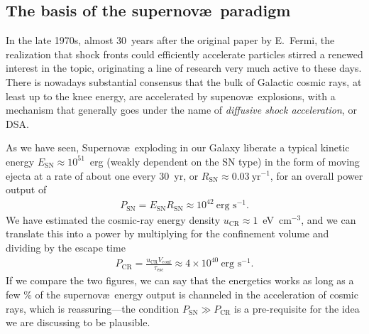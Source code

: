\subsection{The basis of the supernov\ae~paradigm}

In the late 1970s, almost 30~years after the original paper by E.~Fermi, the
realization that shock fronts could efficiently accelerate particles stirred a renewed
interest in the topic, originating a line of research very much active to these days.
There is nowadays substantial consensus that the bulk of Galactic cosmic rays, at
least up to the knee energy, are accelerated by supenov\ae\ explosions, with a mechanism
that generally goes under the name of \emph{diffusive shock acceleration}, or DSA.

As we have seen, Supernov\ae\ exploding in our Galaxy liberate a typical kinetic
energy $E_\text{SN} \approx 10^{51}$~erg (weakly dependent on the SN type) in the
form of moving ejecta at a rate of about one every 30~yr, or
$R_\text{SN} \approx 0.03~\text{yr}^{-1}$, for an overall
power output of
\begin{align*}
  P_\text{SN} = E_\text{SN} R_\text{SN} \approx 10^{42}~\text{erg~s}^{-1}.
\end{align*}
We have estimated the cosmic-ray energy density $u_\text{CR} \approx 1$~eV~cm$^{-3}$,
and we can translate this into a power by multiplying for the confinement
volume 
and dividing by the escape time
\begin{align*}
  P_\text{CR} = \frac{u_\text{CR} V_\text{conf}}{\tau_\text{esc}}
  \approx 4 \times 10^{40}~\text{erg~s}^{-1}.
\end{align*}
If we compare the two figures, we can say that the energetics works as long as
a few \% of the supernov\ae~energy output is channeled in the acceleration of
cosmic rays, which is reassuring---the condition $P_\text{SN} \gg P_\text{CR}$ is
a pre-requisite for the idea we are discussing to be plausible.

